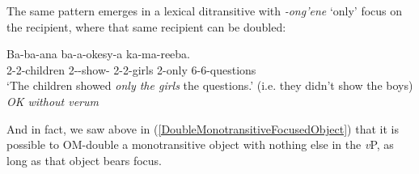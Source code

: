 \documentclass[output=paper]{langscibook}
\begin{document}
\noindent The same pattern emerges in a lexical ditransitive with \textit{-ong’ene} `only' focus on the recipient, where that same recipient can be doubled:  

\ea 
\gll Ba-ba-ana ba-a-okesy-a  ka-ma-reeba. \\
2-2-children 2\Sm-\Om-show-\Fv{} {2-2-girls \hspace{8mm} 2-only} 6-6-questions \\
\glt `The children showed \textit{only the girls} the questions.' (i.e. they didn't show the boys) \textit{OK without verum}
\z

And in fact, we saw above in (\ref{DoubleMonotransitiveFocusedObject}) that it is possible to OM-double a monotransitive object with nothing else in the \textit{v}P, as long as that object bears focus.






\end{document}
